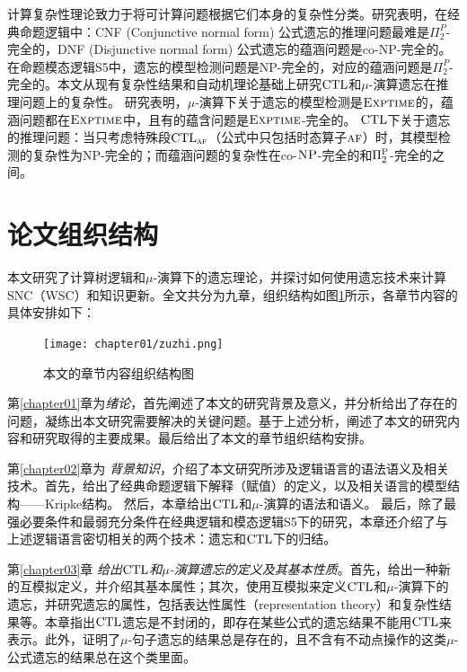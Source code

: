 计算复杂性理论致力于将可计算问题根据它们本身的复杂性分类。研究表明，在经典命题逻辑中：CNF (Conjunctive normal form) 公式遗忘的推理问题最难是$\Pi_2^P$-完全的，DNF (Disjunctive normal form) 公式遗忘的蕴涵问题是co-NP-完全的。在命题模态逻辑S5中，遗忘的模型检测问题是NP-完全的，对应的蕴涵问题是$\Pi_2^P$-完全的。本文从现有复杂性结果和自动机理论基础上研究$\textrm{CTL}$和$\mu$-演算遗忘在推理问题上的复杂性。
研究表明，$\mu$-演算下关于遗忘的模型检测是$\textsc{Exptime}$的，蕴涵问题都在$\textsc{Exptime}$中，且有的蕴含问题是$\textsc{Exptime}$-完全的。
$\textrm{CTL}$下关于遗忘的推理问题：当只考虑特殊段$\textrm{CTL}_{\textsc{a} \textsc{f}}$（公式中只包括时态算子$\textsc{a} \textsc{f}$）时，其模型检测的复杂性为\textsc{NP}-完全的；而蕴涵问题的复杂性在co-$\textsc{NP}$-完全的和$\Pi_2^{\textsc{P}}$-完全的之间。








\section{论文组织结构}
本文研究了计算树逻辑和$\mu$-演算下的遗忘理论，并探讨如何使用遗忘技术来计算SNC（WSC）和知识更新。全文共分为九章，组织结构如图\ref{fig:chapter1-research-structure}所示，各章节内容的具体安排如下：


\begin{figure}[htbp]
	\centering
	\texttt{[image: chapter01/zuzhi.png]}
	\caption{本文的章节内容组织结构图}
	\label{fig:chapter1-research-structure}
\end{figure}

第\ref{chapter01}章为\textit{绪论}，首先阐述了本文的研究背景及意义，并分析给出了存在的问题，凝练出本文研究需要解决的关键问题。基于上述分析，阐述了本文的研究内容和研究取得的主要成果。最后给出了本文的章节组织结构安排。


第\ref{chapter02}章为 {\em 背景知识}，介绍了本文研究所涉及逻辑语言的语法语义及相关技术。首先，给出了经典命题逻辑下解释（赋值）的定义，以及相关语言的模型结构——Kripke结构。
然后，本章给出$\textrm{CTL}$和$\mu$-演算的语法和语义。
最后，除了最强必要条件和最弱充分条件在经典逻辑和模态逻辑S5下的研究，本章还介绍了与上述逻辑语言密切相关的两个技术：遗忘和$\textrm{CTL}$下的归结。



第\ref{chapter03}章 {\em 给出$\textrm{CTL}$和$\mu$-演算遗忘的定义及其基本性质}。首先，给出一种新的互模拟定义，并介绍其基本属性；其次，使用互模拟来定义$\textrm{CTL}$和$\mu$-演算下的遗忘，并研究遗忘的属性，包括表达性属性（representation theory）和复杂性结果等。本章指出$\textrm{CTL}$遗忘是不封闭的，即存在某些公式的遗忘结果不能用$\textrm{CTL}$来表示。此外，证明了$\mu$-句子遗忘的结果总是存在的，且不含有不动点操作的这类$\mu$-公式遗忘的结果总在这个类里面。

